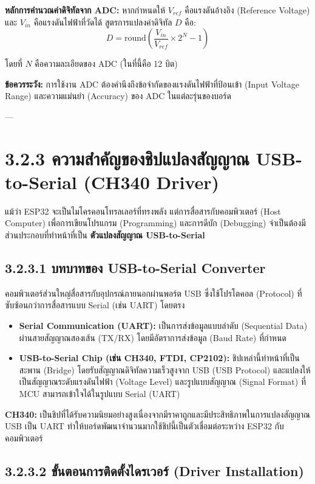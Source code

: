\documentclass[11pt,a4paper,openany]{report}
\begin{document}
\textbf{หลักการคำนวณค่าดิจิทัลจาก ADC:}
หากกำหนดให้ $V_{ref}$ คือแรงดันอ้างอิง (Reference Voltage) และ $V_{in}$ คือแรงดันไฟฟ้าที่วัดได้ สูตรการแปลงค่าดิจิทัล $D$ คือ:
$$D = \text{round} \left( \frac{V_{in}}{V_{ref}} \times 2^N - 1 \right)$$

โดยที่ $N$ คือความละเอียดของ ADC (ในที่นี้คือ 12 บิต)

\textbf{ข้อควรระวัง:} การใช้งาน ADC ต้องคำนึงถึงข้อจำกัดของแรงดันไฟฟ้าที่ป้อนเข้า (Input Voltage Range) และความแม่นยำ (Accuracy) ของ ADC ในแต่ละรุ่นของบอร์ด

---

\section{3.2.3 ความสำคัญของชิปแปลงสัญญาณ USB-to-Serial (CH340 Driver)}


แม้ว่า ESP32 จะเป็นไมโครคอนโทรลเลอร์ที่ทรงพลัง แต่การสื่อสารกับคอมพิวเตอร์ (Host Computer) เพื่อการเขียนโปรแกรม (Programming) และการดีบัก (Debugging) จำเป็นต้องมีส่วนประกอบที่ทำหน้าที่เป็น \textbf{ตัวแปลงสัญญาณ USB-to-Serial}

\subsection{3.2.3.1 บทบาทของ USB-to-Serial Converter}


คอมพิวเตอร์ส่วนใหญ่สื่อสารกับอุปกรณ์ภายนอกผ่านพอร์ต USB ซึ่งใช้โปรโตคอล (Protocol) ที่ซับซ้อนกว่าการสื่อสารแบบ Serial (เช่น UART) โดยตรง

\begin{itemize}
  \item \textbf{Serial Communication (UART):} เป็นการส่งข้อมูลแบบลำดับ (Sequential Data) ผ่านสายสัญญาณสองเส้น (TX/RX) โดยมีอัตราการส่งข้อมูล (Baud Rate) ที่กำหนด
  \item \textbf{USB-to-Serial Chip (เช่น CH340, FTDI, CP2102):} ชิปเหล่านี้ทำหน้าที่เป็นสะพาน (Bridge) โดยรับสัญญาณดิจิทัลความเร็วสูงจาก USB (USB Protocol) และแปลงให้เป็นสัญญาณระดับแรงดันไฟฟ้า (Voltage Level) และรูปแบบสัญญาณ (Signal Format) ที่ MCU สามารถเข้าใจได้ในรูปแบบ Serial (UART)
\end{itemize}


\textbf{CH340:} เป็นชิปที่ได้รับความนิยมอย่างสูงเนื่องจากมีราคาถูกและมีประสิทธิภาพในการแปลงสัญญาณ USB เป็น UART ทำให้บอร์ดพัฒนาจำนวนมากใช้ชิปนี้เป็นตัวเชื่อมต่อระหว่าง ESP32 กับคอมพิวเตอร์

\subsection{3.2.3.2 ขั้นตอนการติดตั้งไดรเวอร์ (Driver Installation)}
\end{document}
